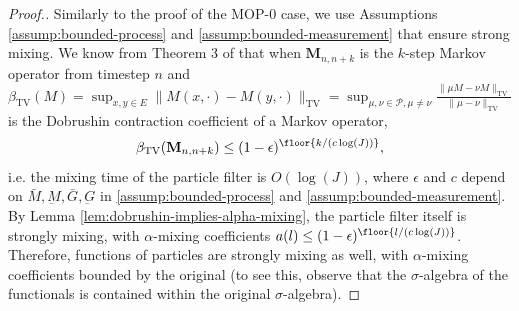 \begin{proof}[Proof.]
Similarly to the proof of the MOP-$0$ case, we use Assumptions \ref{assump:bounded-process} and \ref{assump:bounded-measurement} that ensure strong mixing. We know from Theorem 3 of \cite{karjalainen23} that when $\textbf{M}_{n,n+k}$ is the $k$-step Markov operator from timestep $n$ and $\beta_{\text{TV}}(M) = \sup _{x, y \in E}\|M(x, \cdot)-M(y, \cdot)\|_{\mathrm{TV}}=\sup _{\mu, \nu \in \mathcal{P}, \mu \neq \nu} \frac{\|\mu M-\nu M\|_{\mathrm{TV}}}{\|\mu-\nu\|_{\mathrm{TV}}}$ is the Dobrushin contraction coefficient of a Markov operator, 
\begin{equation}
\beta_{\text{TV}}(\textbf{M}_{n,n+k}) \leq (1-\epsilon)^{\floor{k/(c\log(J))}},
\end{equation}
i.e. the mixing time of the particle filter is $O(\log(J))$, where $\epsilon$ and $c$ depend on $\bar{M}, \underbar{M}, \bar{G}, \underbar{G}$ in \ref{assump:bounded-process} and \ref{assump:bounded-measurement}. By Lemma \ref{lem:dobrushin-implies-alpha-mixing}, the particle filter itself is strongly mixing, with $\alpha$-mixing coefficients $a(l) \leq (1-\epsilon)^{\floor{l/(c\log(J))}}$. Therefore, functions of particles are strongly mixing as well, with $\alpha$-mixing coefficients bounded by the original (to see this, observe that the $\sigma$-algebra of the functionals is contained within the original $\sigma$-algebra).


\end{proof}
